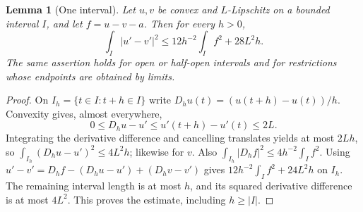 \documentclass[11pt]{article}
\newtheorem{lemma}[theorem]{Lemma}
\theoremstyle{remark}\newtheorem{remark}[theorem]{Remark}
\begin{document}
\begin{lemma}[One interval]\label{lem:interval}
Let $u,v$ be convex and $L$-Lipschitz on a bounded interval $I$, and let $f=u-v-a$. Then for every $h>0$,
\[
 \int_I|u'-v'|^2\le12h^{-2}\int_I f^2+28L^2h.
\]
The same assertion holds for open or half-open intervals and for restrictions whose endpoints are obtained by limits.
\end{lemma}
\begin{proof}
On $I_h=\{t\in I:t+h\in I\}$ write
$D_hu(t)=(u(t+h)-u(t))/h$. Convexity gives, almost everywhere,
\[
 0\le D_hu-u'\le u'(t+h)-u'(t)\le2L.
\]
Integrating the derivative difference and cancelling translates yields at most $2Lh$, so
$\int_{I_h}(D_hu-u')^2\le4L^2h$; likewise for $v$. Also
$\int_{I_h}|D_hf|^2\le4h^{-2}\int_I f^2$. Using
$u'-v'=D_hf-(D_hu-u')+(D_hv-v')$ gives $12h^{-2}\int_I f^2+24L^2h$ on $I_h$. The remaining interval length is at most $h$, and its squared derivative difference is at most $4L^2$. This proves the estimate, including $h\ge|I|$.
\end{proof}
\end{document}
